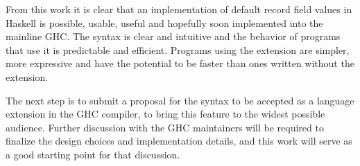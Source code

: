 \documentclass[en]{pracamgr}
\begin{document}
From this work it is clear that an implementation of default record field values in Haskell is possible, usable, useful and hopefully soon implemented
into the mainline GHC. The syntax is clear and intuitive and the behavior of programs that use it is predictable and efficient.
Programs using the extension are simpler, more expressive and have the potential to be faster than ones written without the extension.

The next step is to submit a proposal for the syntax to be accepted as a language extension in the GHC compiler, to bring this feature to the widest possible audience.
Further discussion with the GHC maintainers will be required to finalize the design choices and implementation details, and this work will serve
as a good starting point for that discussion.


\appendix
\end{document}
